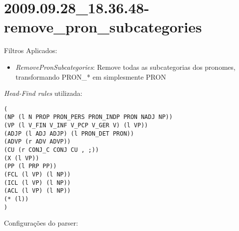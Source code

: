 \section{2009.09.28_18.36.48-remove_pron_subcategories} %
\label{sec:exp:2009.09.28_18.36.48-remove_pron_subcategories}

Filtros Aplicados:

\begin{itemize}
  
  \item{\emph{RemovePronSubcategories}: Remove todas as subcategorias dos pronomes, transformando PRON_* em simplesmente PRON}
  
\end{itemize}

\emph{Head-Find rules} utilizada:

\scriptsize
\begin{verbatim}
(
(NP (l N PROP PRON_PERS PRON_INDP PRON NADJ NP))
(VP (l V_FIN V_INF V_PCP V_GER V) (l VP))
(ADJP (l ADJ ADJP) (l PRON_DET PRON))
(ADVP (r ADV ADVP))
(CU (r CONJ_C CONJ CU , ;))
(X (l VP))
(PP (l PRP PP))
(FCL (l VP) (l NP))
(ICL (l VP) (l NP))
(ACL (l VP) (l NP))
(* (l))
)

\end{verbatim}

\normalsize

Configurações do parser:

